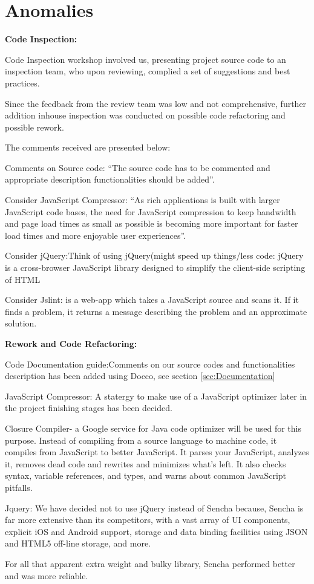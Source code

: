 \section{Anomalies} %
\label{sec:Anomalies}

\textbf{Code Inspection:}

Code Inspection workshop involved us, presenting project source code to an inspection team,
who upon reviewing, complied a set of suggestions and best practices.

Since the feedback from the review team was low and not comprehensive, further addition inhouse inspection was conducted on possible 
code refactoring and possible rework.

The comments received are presented below:

Comments on Source code: ``The source code has to be commented and appropriate description functionalities should be added''.

Consider JavaScript Compressor: ``As rich applications is built with larger JavaScript code bases, the need for JavaScript compression 
to keep bandwidth and page load times as small as possible is becoming more important for faster load times and more enjoyable user experiences''.

Consider jQuery:Think of using jQuery(might speed up things/less code: jQuery is a cross-browser JavaScript library designed to simplify the client-side scripting of HTML
 
Consider Jslint: is a web-app which takes a JavaScript source and scans it. If it finds a problem, it returns a message describing the problem and an approximate solution. 


\textbf{Rework and Code Refactoring:}

Code Documentation guide:Comments on our source codes and functionalities description has been added using Docco, see section \ref{sec:Documentation}

JavaScript Compressor: A statergy to make use of a JavaScript optimizer later in the project finishing stages has been decided.

Closure Compiler- a Google service for Java code optimizer will be used for this purpose. Instead of compiling from a source language to machine code, it compiles from JavaScript to better JavaScript. It parses your JavaScript, analyzes it, removes dead code and rewrites and minimizes what's left. 
It also checks syntax, variable references, and types, and warns about common JavaScript pitfalls. 

Jquery: We have decided not to use jQuery instead of Sencha because, Sencha is far more extensive than its competitors, with a vast array of UI    
components, explicit iOS and Android support, storage and data binding facilities using JSON and HTML5 off-line storage, and more.

For all that apparent extra weight and bulky library, Sencha performed better and was more reliable.

